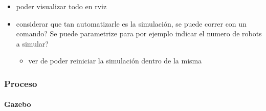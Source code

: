\begin{itemize}
  \item poder visualizar todo en rviz 

  \item considerar que tan automatizarle es la simulación, se puede correr con un comando? Se puede parametrize para por ejemplo indicar el numero de robots a simular? 
  \begin{itemize}
    \item ver de poder reiniciar la simulación dentro de la misma  
  \end{itemize}
\end{itemize}


\subsubsection{Proceso}
\paragraph{Gazebo}
